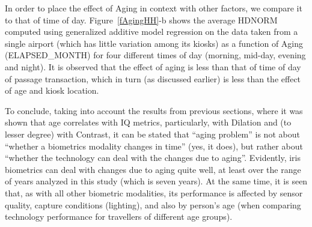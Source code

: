 \documentclass{cta-author}%
\newcommand{\cmt}[1]{}
\begin{document}




In order to place the effect of Aging in context with other factors, 
we compare it to that of 
time of day. Figure~\ref{fAgingHH}-b shows the average HDNORM computed using generalized additive model regression on the data taken from a single airport (which has little variation among its kiosks) as a function of Aging (ELAPSED\_MONTH) for four different times of day (morning, mid-day, evening and night).
It is observed that the effect of aging is less  than that of time of day of passage transaction, which in turn (as discussed earlier) is less than the effect of age and kiosk location.

To conclude, 
taking into account the results from previous sections, where it was shown that age correlates with IQ metrics, particularly, with Dilation  and (to lesser degree) with Contrast, it can be stated 
that ``aging problem'' is not about ``whether a biometrics modality changes in time'' (yes, it does), but rather about ``whether the technology can deal with the changes due to aging''. 
Evidently, iris biometrics can deal with changes due to aging quite well, at least 
over the range of years analyzed in this  study (which is seven years). 
At the same time, 
it is seen that, as with all other biometric modalities, its performance is affected by sensor quality, capture conditions (lighting), and also by person's age (when comparing technology performance for  travellers of  different age groups).

\end{document}
